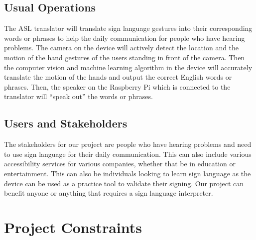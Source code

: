 \documentclass[12pt]{article}
\begin{document}
\subsection{Usual Operations}
The ASL translator will translate sign language gestures into their corresponding words or phrases to help the daily communication 
for people who have hearing problems. The camera on the device will actively detect the location and the motion of the hand gestures 
of the users standing in front of the camera. Then the computer vision and machine learning algorithm in the device will accurately 
translate the motion of the hands and output the correct English words or phrases. Then, the speaker on the Raspberry Pi which is connected 
to the translator will “speak out” the words or phrases.\\

\subsection{Users and Stakeholders}
The stakeholders for our project are people who have hearing problems and need to use sign language for their daily communication. This 
can also include various accessibility services for various companies, whether that be in education or entertainment. This can also be 
individuals looking to learn sign language as the device can be used as a practice tool to validate their signing. Our project can benefit 
anyone or anything that requires a sign language interpreter.\\

\section{Project Constraints}
\end{document}
